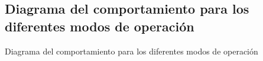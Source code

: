 \subsection{Diagrama del comportamiento para los diferentes modos de operación}
\label{Diagrama_modos_operacion}

Diagrama del comportamiento para los diferentes modos de operación
